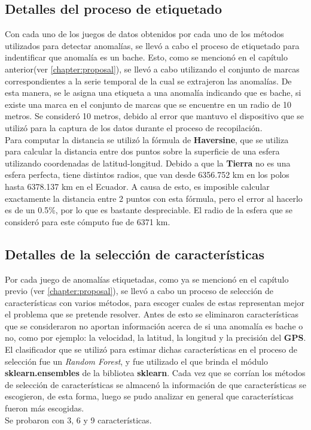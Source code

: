 	\subsection{Detalles del proceso de etiquetado}
		Con cada uno de los juegos de datos obtenidos por cada uno de los métodos utilizados para detectar anomalías, se llevó a cabo
		el proceso de etiquetado para indentificar que anomalía es un bache. Esto, como se mencionó en el capítulo anterior(ver \ref{chapter:proposal}),
		se llevó a cabo utilizando el conjunto de marcas correspondientes a la serie temporal de la cual se extrajeron las anomalías. De esta manera, se
		le asigna una etiqueta a una anomalía indicando que es bache, si existe una marca en el conjunto de marcas que se encuentre en un radio de 10
		metros. Se consideró 10 metros, debido al error que mantuvo el dispositivo que se utilizó para la captura de los datos durante el proceso de
		recopilación.\\
		\indent Para computar la distancia se utilizó la fórmula de \textbf{Haversine}, que se utiliza para calcular la distancia entre dos puntos sobre la
		superficie de una esfera utilizando coordenadas de latitud-longitud. Debido a que la \textbf{Tierra} no es una esfera perfecta, tiene distintos radios, que
		van desde 6356.752 km en los polos hasta 6378.137 km en el Ecuador. A causa de esto, es imposible calcular exactamente la distancia entre 2 puntos
		con esta fórmula, pero el error al hacerlo es de un 0.5\%, por lo que es bastante despreciable. El radio de la esfera que se consideró para este
		cómputo fue de 6371 km.\\

	\subsection{Detalles de la selección de características}
		Por cada juego de anomalías etiquetadas, como ya se mencionó en el capítulo previo (ver \ref{chapter:proposal}), se llevó a cabo un proceso
		de selección de características con varios métodos, para escoger cuales de estas representan mejor el problema que se pretende resolver.
		Antes de esto se eliminaron características que se consideraron no aportan información acerca de si una anomalía es bache o no, como por ejemplo:
		la velocidad, la latitud, la longitud y la precisión del \textbf{GPS}.\\
		\indent El clasificador que se utilizó para estimar dichas características en el proceso de selección fue un \emph{Random Forest}, y fue
		utilizado el que brinda el módulo \textbf{sklearn.ensembles} de la bibliotea \textbf{sklearn}. Cada vez que se corrían los métodos de selección
		de características se almacenó la información de que características se escogieron, de esta forma, luego se pudo analizar en general que
		características fueron más escogidas.\\
		\indent Se probaron con 3, 6 y 9 características.

